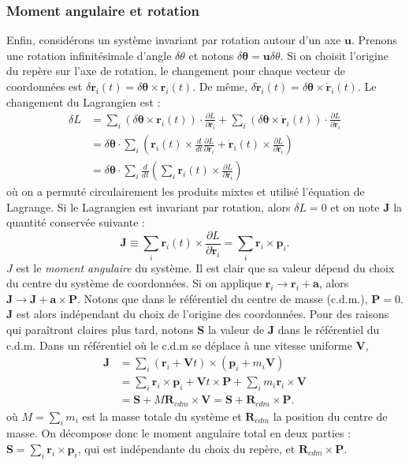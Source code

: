 \subsubsection{Moment angulaire et rotation}
Enfin, considérons un système invariant par rotation autour d'un axe $\bm{u}$. Prenons une rotation infinitésimale d'angle $\delta\theta$ et notons $\delta\bm{\theta}=\bm{u}\delta\theta$. Si on choisit l'origine du repère sur l'axe de rotation, le changement pour chaque vecteur de coordonnées est $\delta\bm{r}_i(t) = \delta\bm{\theta}\times\bm{r}_i(t)$. De même, $\delta\bm{\dot{r}}_i(t) = \delta\bm{\theta}\times\bm{\dot{r}}_i(t)$. Le changement du Lagrangien est :
\begin{align}
\delta L &=\sum_i \left(\delta\bm{\theta}\times\bm{r}_i(t)\right)\cdot\frac{\partial L}{\partial \bm{r}_i}+\sum_i \left(\delta\bm{\theta}\times\bm{\dot{r}}_i(t)\right)\cdot\frac{\partial L}{\partial \bm{\dot{r}}_i}\\
&=\delta\bm{\theta}\cdot\sum_i\left(\bm{r}_i(t)\times\frac{d}{dt}\frac{\partial L}{\partial {\dot{\bm{r}}}_i}
+\bm{\dot{r}}_i(t)\times\frac{\partial L}{\partial \bm{\dot{r}}_i}\right)\\
&=\delta\bm{\theta}\cdot\sum_i\frac{d}{dt}\left(\sum_i \bm{r}_i(t)\times\frac{\partial L}{\partial \bm{\dot{r}}_i}\right)
\end{align}
où on a permuté circulairement les produits mixtes et utilisé l'équation de Lagrange. Si le Lagrangien est invariant par rotation, alors $\delta L = 0$ et on note $\bm{J}$ la quantité conservée suivante :
\begin{equation}
\bm{J}\equiv\sum_i \bm{r}_i(t)\times\frac{\partial L}{\partial \bm{\dot{r}}_i}=\sum_i \bm{r}_i\times\bm{p}_i.
\label{eq:defJ}
\end{equation}
$J$ est le \textit{moment angulaire} du système. Il est clair que sa valeur dépend du choix du centre du système de coordonnées. Si on applique $\bm{r}_i\rightarrow \bm{r}_i+\bm{a}$, alors $\bm{J}\rightarrow \bm{J}+\bm{a}\times\bm{P}$. Notons que dans le référentiel du centre de masse (c.d.m.), $\bm{P}=0$. $\bm{J}$ est alors indépendant du choix de l'origine des coordonnées. Pour des raisons qui paraîtront claires plus tard, notons $\bm{S}$ la valeur de $\bm{J}$ dans le référentiel du c.d.m. Dans un référentiel où le c.d.m se déplace à une vitesse uniforme $\bm{V}$, 
\begin{align}
\bm{J}&=\sum_i \left(\bm{r}_i+\bm{V}t\right)\times\left(\bm{p}_i+m_i\bm{V}\right)\\
&= \sum_i\bm{r}_i\times\bm{p}_i+\bm{V}t\times\bm{P}+\sum_i m_i\bm{r}_i\times\bm{V} \\
&= \bm{S} + M \bm{R}_{cdm}\times\bm{V} = \bm{S} + \bm{R}_{cdm}\times\bm{P}.
\end{align}
où $M=\sum_i m_i$ est la masse totale du système et $\bm{R}_{cdm}$ la position du centre de masse. On décompose donc le moment angulaire total en deux parties : $\bm{S}=\sum_i\bm{r}_i\times\bm{p}_i$, qui est indépendante du choix du repère, et $\bm{R}_{cdm}\times\bm{P}$.

